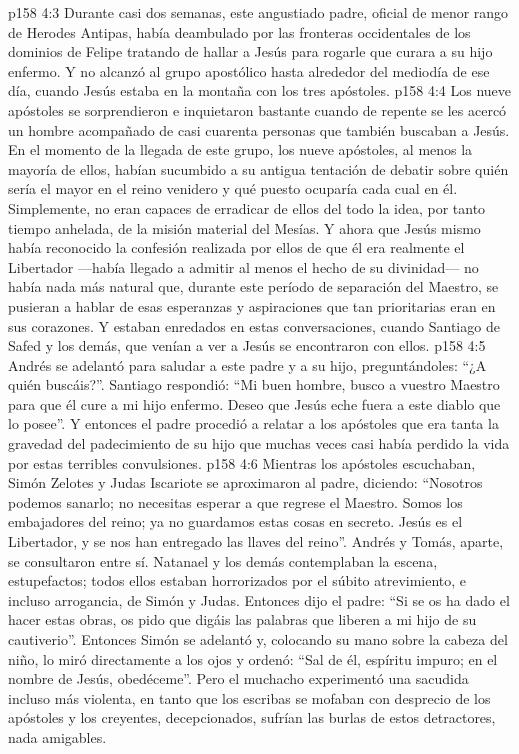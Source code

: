 \vs p158 4:3 Durante casi dos semanas, este angustiado padre, oficial de menor rango de Herodes Antipas, había deambulado por las fronteras occidentales de los dominios de Felipe tratando de hallar a Jesús para rogarle que curara a su hijo enfermo. Y no alcanzó al grupo apostólico hasta alrededor del mediodía de ese día, cuando Jesús estaba en la montaña con los tres apóstoles.
\vs p158 4:4 Los nueve apóstoles se sorprendieron e inquietaron bastante cuando de repente se les acercó un hombre acompañado de casi cuarenta personas que también buscaban a Jesús. En el momento de la llegada de este grupo, los nueve apóstoles, al menos la mayoría de ellos, habían sucumbido a su antigua tentación de debatir sobre quién sería el mayor en el reino venidero y qué puesto ocuparía cada cual en él. Simplemente, no eran capaces de erradicar de ellos del todo la idea, por tanto tiempo anhelada, de la misión material del Mesías. Y ahora que Jesús mismo había reconocido la confesión realizada por ellos de que él era realmente el Libertador ---había llegado a admitir al menos el hecho de su divinidad--- no había nada más natural que, durante este período de separación del Maestro, se pusieran a hablar de esas esperanzas y aspiraciones que tan prioritarias eran en sus corazones. Y estaban enredados en estas conversaciones, cuando Santiago de Safed y los demás, que venían a ver a Jesús se encontraron con ellos.
\vs p158 4:5 Andrés se adelantó para saludar a este padre y a su hijo, preguntándoles: “¿A quién buscáis?”. Santiago respondió: “Mi buen hombre, busco a vuestro Maestro para que él cure a mi hijo enfermo. Deseo que Jesús eche fuera a este diablo que lo posee”. Y entonces el padre procedió a relatar a los apóstoles que era tanta la gravedad del padecimiento de su hijo que muchas veces casi había perdido la vida por estas terribles convulsiones.
\vs p158 4:6 Mientras los apóstoles escuchaban, Simón Zelotes y Judas Iscariote se aproximaron al padre, diciendo: “Nosotros podemos sanarlo; no necesitas esperar a que regrese el Maestro. Somos los embajadores del reino; ya no guardamos estas cosas en secreto. Jesús es el Libertador, y se nos han entregado las llaves del reino”. Andrés y Tomás, aparte, se consultaron entre sí. Natanael y los demás contemplaban la escena, estupefactos; todos ellos estaban horrorizados por el súbito atrevimiento, e incluso arrogancia, de Simón y Judas. Entonces dijo el padre: “Si se os ha dado el hacer estas obras, os pido que digáis las palabras que liberen a mi hijo de su cautiverio”. Entonces Simón se adelantó y, colocando su mano sobre la cabeza del niño, lo miró directamente a los ojos y ordenó: “Sal de él, espíritu impuro; en el nombre de Jesús, obedéceme”. Pero el muchacho experimentó una sacudida incluso más violenta, en tanto que los escribas se mofaban con desprecio de los apóstoles y los creyentes, decepcionados, sufrían las burlas de estos detractores, nada amigables.
